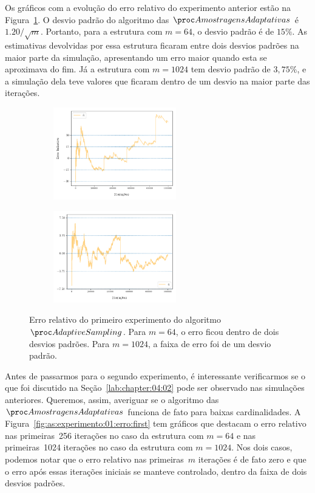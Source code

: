 Os gráficos com a evolução do erro relativo do experimento anterior estão na Figura~\ref{fig:as:experimento:01:erro}.
O desvio padrão do algoritmo das $\asampling$ é $1.20/\sqrt{m}$. Portanto, para a estrutura com $m = 64$, o desvio 
padrão é de $15\%$. As estimativas devolvidas por essa estrutura ficaram entre dois desvios padrões na maior parte da 
simulação, apresentando um erro maior quando esta se aproximava do fim. Já a estrutura com $m = 1024$ tem desvio padrão 
de $3{,}75\%$, e a simulação dela teve valores que ficaram dentro de um desvio na maior parte das iterações.

\begin{figure}
  \centering
  \begin{subfigure}{.5\textwidth}
    \centering
    \includegraphics[width=\linewidth, height=4cm]{figuras/adaptive_sampling_erro_full_64.png}
  \end{subfigure}%
  \begin{subfigure}{.5\textwidth}
    \centering
    \includegraphics[width=\linewidth, height=4cm]{figuras/adaptive_sampling_erro_full_1024.png}
  \end{subfigure}
  \caption{Erro relativo do primeiro experimento do algoritmo $\AS$. Para $m = 64$, o erro ficou dentro de dois desvios
  padrões. Para $m = 1024$, a faixa de erro foi de um desvio padrão.}
  \label{fig:as:experimento:01:erro}
\end{figure}

Antes de passarmos para o segundo experimento, é interessante verificarmos se o que foi discutido na 
Seção~\ref{lab:chapter:04:02} pode ser observado nas simulações anteriores. Queremos, assim, averiguar se o algoritmo 
das~$\asampling$ funciona de fato para baixas cardinalidades. A Figura~\ref{fig:as:experimento:01:erro:first} tem
gráficos que destacam o erro relativo nas primeiras~256 iterações no caso da estrutura com $m = 64$ e nas primeiras~1024
iterações no caso da estrutura com $m = 1024$. Nos dois casos, podemos notar que o erro relativo nas primeiras~$m$ 
iterações é de fato zero e que o erro após essas iterações iniciais se manteve controlado, dentro da faixa de dois 
desvios padrões.

